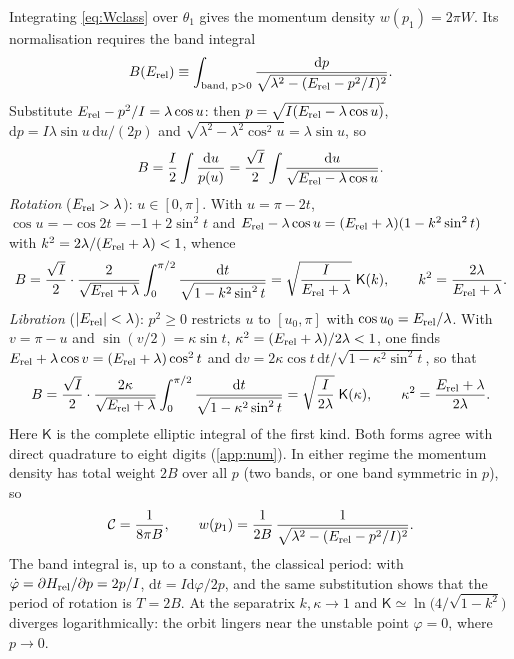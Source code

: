 \documentclass[preprint,12pt]{elsarticle}
\newcommand{\dd}{\mathrm{d}}
\newcommand{\Erel}{E_{\rm rel}}
\begin{document}
Integrating \eqref{eq:Wclass} over $\theta_{1}$ gives the momentum density
$w(p_{1})=2\pi W$. Its normalisation requires the band integral
\begin{equation}
B(\Erel)\equiv\int_{\rm band,\;p>0}
\frac{\dd p}{\sqrt{\lambda^{2}-(\Erel-p^{2}/I)^{2}}} .
\end{equation}
Substitute $\Erel-p^{2}/I=\lambda\cos u$: then $p=\sqrt{I(\Erel-\lambda\cos u)}$,
$\dd p=I\lambda\sin u\,\dd u/(2p)$ and
$\sqrt{\lambda^{2}-\lambda^{2}\cos^{2}u}=\lambda\sin u$, so
\begin{equation}
B=\frac{I}{2}\int\frac{\dd u}{p(u)}
=\frac{\sqrt{I}}{2}\int\frac{\dd u}{\sqrt{\Erel-\lambda\cos u}} .
\end{equation}
\emph{Rotation} ($\Erel>\lambda$): $u\in[0,\pi]$. With $u=\pi-2t$,
$\cos u=-\cos2t=-1+2\sin^{2}t$ and
$\Erel-\lambda\cos u=(\Erel+\lambda)(1-k^{2}\sin^{2}t)$ with
$k^{2}=2\lambda/(\Erel+\lambda)<1$, whence
\begin{equation}
B=\frac{\sqrt I}{2}\cdot\frac{2}{\sqrt{\Erel+\lambda}}\int_{0}^{\pi/2}
\frac{\dd t}{\sqrt{1-k^{2}\sin^{2}t}}
=\sqrt{\frac{I}{\Erel+\lambda}}\;\mathsf{K}(k),\qquad
k^{2}=\frac{2\lambda}{\Erel+\lambda}.
\label{eq:Brot}
\end{equation}
\emph{Libration} ($|\Erel|<\lambda$): $p^{2}\ge0$ restricts $u$ to
$[u_{0},\pi]$ with $\cos u_{0}=\Erel/\lambda$. With $v=\pi-u$ and
$\sin(v/2)=\kappa\sin t$, $\kappa^{2}=(\Erel+\lambda)/2\lambda<1$, one finds
$\Erel+\lambda\cos v=(\Erel+\lambda)\cos^{2}t$ and
$\dd v=2\kappa\cos t\,\dd t/\sqrt{1-\kappa^{2}\sin^{2}t}$, so that
\begin{equation}
B=\frac{\sqrt I}{2}\cdot\frac{2\kappa}{\sqrt{\Erel+\lambda}}\int_{0}^{\pi/2}
\frac{\dd t}{\sqrt{1-\kappa^{2}\sin^{2}t}}
=\sqrt{\frac{I}{2\lambda}}\;\mathsf{K}(\kappa),\qquad
\kappa^{2}=\frac{\Erel+\lambda}{2\lambda}.
\label{eq:Blib}
\end{equation}
Here $\mathsf{K}$ is the complete elliptic integral of the first kind. Both forms
agree with direct quadrature to eight digits (\ref{app:num}). In either regime
the momentum density has total weight $2B$ over all $p$ (two bands, or one band
symmetric in $p$), so
\begin{equation}
\mathcal{C}=\frac{1}{8\pi B},\qquad
w(p_{1})=\frac{1}{2B}\,\frac{1}{\sqrt{\lambda^{2}-(\Erel-p^{2}/I)^{2}}}.
\end{equation}
The band integral is, up to a constant, the classical period: with
$\dot\varphi=\partial H_{\rm rel}/\partial p=2p/I$,
$\dd t=I\dd\varphi/2p$, and the same substitution shows that the period of
rotation is $T=2B$. At the separatrix $k,\kappa\to1$ and
$\mathsf{K}\simeq\ln\big(4/\sqrt{1-k^{2}}\big)$ diverges logarithmically: the
orbit lingers near the unstable point $\varphi=0$, where $p\to0$.
\end{document}
